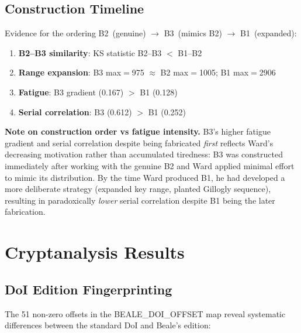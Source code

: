 \documentclass[11pt,a4paper]{article}
\begin{document}
\subsection{Construction Timeline}

Evidence for the ordering B2~(genuine) $\to$ B3~(mimics B2) $\to$ B1~(expanded):

\begin{enumerate}[nosep]
    \item \textbf{B2--B3 similarity}: KS statistic B2--B3 $<$ B1--B2
    \item \textbf{Range expansion}: B3 max$=$975 $\approx$ B2 max$=$1005; B1 max$=$2906
    \item \textbf{Fatigue}: B3 gradient (0.167) $>$ B1 (0.128)
    \item \textbf{Serial correlation}: B3 (0.612) $>$ B1 (0.252)
\end{enumerate}

\noindent\textbf{Note on construction order vs fatigue intensity.}
B3's higher fatigue gradient and serial correlation despite being fabricated
\emph{first} reflects Ward's decreasing motivation rather than accumulated
tiredness: B3 was constructed immediately after working with the genuine B2
and Ward applied minimal effort to mimic its distribution. By the time Ward
produced B1, he had developed a more deliberate strategy (expanded key range,
planted Gillogly sequence), resulting in paradoxically \emph{lower} serial
correlation despite B1 being the later fabrication.

\section{Cryptanalysis Results}

\subsection{DoI Edition Fingerprinting}

The 51 non-zero offsets in the BEALE\_DOI\_OFFSET map reveal systematic differences
between the standard DoI and Beale's edition:
\end{document}
